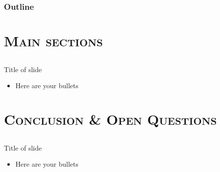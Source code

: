 \documentclass[xcolor=x11names,compress]{beamer}
\renewcommand{\(}{\begin{columns}}
\renewcommand{\)}{\end{columns}}
\newcommand{\<}[1]{\begin{column}{#1}}
\renewcommand{\>}{\end{column}}
\newcommand{\0}{\V{0}}
\newcommand{\1}{\V{1}}
\begin{document}
 

   \begin{frame}
        \frametitle{Outline}
\tableofcontents[hidesubsections]
   \end{frame}


   
\section[Main sections]{\scshape Main sections}
\subsection[ ]{\scshape  }



\begin{frame}{Title of slide}

\begin{itemize}
\item Here are your bullets
\end{itemize} 


\end{frame} 

\section[Conclusion]{\scshape Conclusion \& Open Questions}
\subsection[ ]{\scshape  }



\begin{frame}{Title of slide}

\begin{itemize}
\item Here are your bullets
\end{itemize} 


\end{frame}
\end{document}

